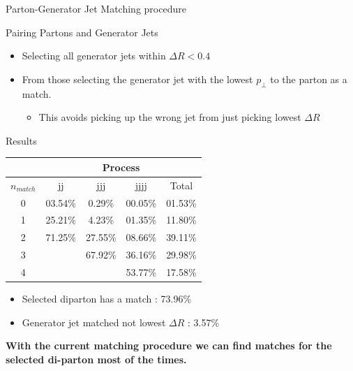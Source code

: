 \documentclass[8pt]{beamer}
\begin{document}
\begin{frame}{Parton-Generator Jet Matching procedure}

\begin{block}{Pairing Partons and Generator Jets}

\begin{itemize}
  \item Selecting all generator jets within $\Delta R < 0.4$ 
  \item From those selecting the generator jet with the lowest $p_\perp$ to the parton as a match.
  \begin{itemize}
    \item This avoids picking up the wrong jet from just picking lowest $\Delta R$
  \end{itemize}
\end{itemize}

\end{block}

\begin{block}{Results}
  
\begin{center}
  

\begin{tabular}{|c||c|c|c||c|}
\hline
            &          \multicolumn{4}{c|}{Process} \\
\hline
$n_{match}$ &      jj &    jjj  &    jjjj &   Total \\
\hline\hline 
          0 & 03.54\% &  0.29\% & 00.05\% & 01.53\% \\
          1 & 25.21\% &  4.23\% & 01.35\% & 11.80\% \\
          2 & 71.25\% & 27.55\% & 08.66\% & 39.11\% \\
          3 &         & 67.92\% & 36.16\% & 29.98\% \\
          4 &         &         & 53.77\% & 17.58\% \\
\hline
\end{tabular}

\end{center}

\begin{itemize}
  \item Selected diparton has a match     : 73.96\%
  \item Generator jet matched not lowest $\Delta R$ :  3.57\%
\end{itemize}

\end{block}

\begin{center}
\textbf{With the current matching procedure we can find matches for the selected di-parton most of the times.}
\end{center}

\end{frame}
\end{document}
